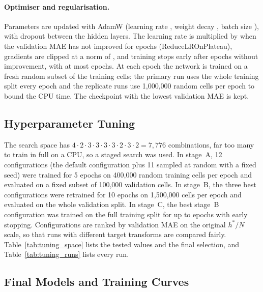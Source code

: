 \documentclass[11pt]{article}
\begin{document}
\paragraph{Optimiser and regularisation.}
Parameters are updated with AdamW (learning rate \trLearningRate, weight decay
\trWeightDecay, batch size \trBatchSize), with dropout \trDropout{} between the hidden
layers. The learning rate is multiplied by \trLRFactor{} when the validation MAE has not
improved for \trLRPatience{} epochs (ReduceLROnPlateau), gradients are clipped at a norm of
\trGradClip, and training stops early after \trPatience{} epochs without improvement, with
at most \trMaxEpochs{} epochs. At each epoch the network is trained on a fresh random
subset of the training cells; the primary run uses the whole training split every epoch
and the replicate runs use 1{,}000{,}000 random cells per epoch to bound the CPU time.
The checkpoint with the lowest validation MAE is kept.

\subsection{Hyperparameter Tuning}
\label{sec:phase3_tuning}

The search space has $4\cdot2\cdot3\cdot3\cdot3\cdot3\cdot2\cdot3\cdot2=7{,}776$
combinations, far too many to train in full on a CPU, so a staged search was used. In
stage~A, 12 configurations (the default configuration plus 11 sampled at random with a
fixed seed) were trained for 5 epochs on 400{,}000 random training cells per epoch and
evaluated on a fixed subset of 100{,}000 validation cells. In stage~B, the three best
configurations were retrained for 10 epochs on 1{,}500{,}000 cells per epoch and evaluated
on the whole validation split. In stage~C, the best stage~B configuration was trained on
the full training split for up to \trMaxEpochs{} epochs with early stopping. Configurations
are ranked by validation MAE on the original $h^*/N$ scale, so that runs with different
target transforms are compared fairly. Table~\ref{tab:tuning_space} lists the tested
values and the final selection, and Table~\ref{tab:tuning_runs} lists every run.





\subsection{Final Models and Training Curves}
\label{sec:phase3_final}
\end{document}
